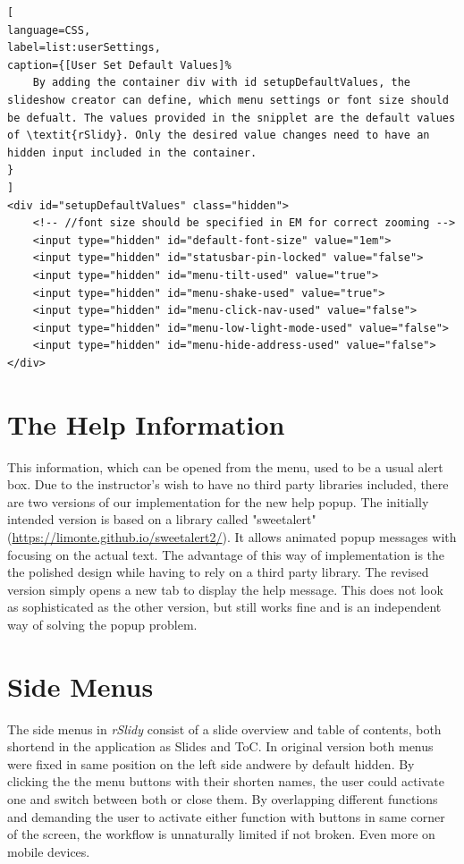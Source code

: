 \begin{minipage}{\linewidth}
\begin{lstlisting}[
language=CSS,
label=list:userSettings,
caption={[User Set Default Values]%
	By adding the container div with id setupDefaultValues, the slideshow creator can define, which menu settings or font size should be defualt. The values provided in the snipplet are the default values of \textit{rSlidy}. Only the desired value changes need to have an hidden input included in the container. 
}
]
<div id="setupDefaultValues" class="hidden">
	<!-- //font size should be specified in EM for correct zooming -->
	<input type="hidden" id="default-font-size" value="1em">
	<input type="hidden" id="statusbar-pin-locked" value="false">
	<input type="hidden" id="menu-tilt-used" value="true">
	<input type="hidden" id="menu-shake-used" value="true">
	<input type="hidden" id="menu-click-nav-used" value="false">
	<input type="hidden" id="menu-low-light-mode-used" value="false">
	<input type="hidden" id="menu-hide-address-used" value="false">
</div>
\end{lstlisting}
\end{minipage}


\section{The Help Information}
This information, which can be opened from the menu, used to be a usual alert box. Due to the instructor's wish to have no third party libraries included, there are two versions of our implementation for the new help popup. The initially intended version is based on a library called "sweetalert" (\url{https://limonte.github.io/sweetalert2/}). It allows animated popup messages with focusing on the actual text. The advantage of this way of implementation is the the polished design while having to rely on a third party library. The revised version simply opens a new tab to display the help message. This does not look as sophisticated as the other version, but still works fine and is an independent way of solving the popup problem.


\section{Side Menus} %
\label{sec:side_menus}

The side menus in \textit{rSlidy} consist of a slide overview and table of contents, both shortend in the application as Slides and ToC. In original version both menus were fixed in same position on the left side andwere by default hidden. By clicking the the menu buttons with their shorten names, the user could activate one and switch between both or close them. By overlapping different functions and demanding the user to activate either function with buttons in same corner of the screen, the workflow is unnaturally limited if not broken. Even more on mobile devices.

